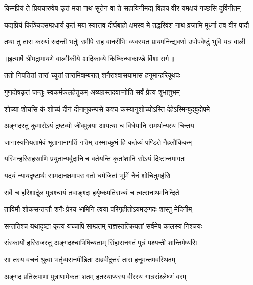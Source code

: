 \fourlineindentedshloka
{किमप्रियं ते प्रियचारुवेष}
{कृतं मया नाथ सुतेन वा ते}
{सहायिनीमद्य विहाय वीर}
{यमक्षयं गच्छसि दुर्विनीतम्} %

\fourlineindentedshloka
{यद्यप्रियं किञ्चिदसम्प्रधार्य}
{कृतं मया स्यात्तव दीर्घबाहो}
{क्षमस्व मे तद्धरिवंश नाथ}
{व्रजामि मूर्ध्ना तव वीर पादौ} %

\fourlineindentedshloka
{तथा तु तारा करुणं रुदन्ती}
{भर्तुः समीपे सह वानरीभिः}
{व्यवस्यत प्रायमनिन्द्यवर्णा}
{उपोपवेष्टुं भुवि यत्र वाली} %


{॥इत्यार्षे श्रीमद्रामायणे वाल्मीकीये आदिकाव्ये किष्किन्धाकाण्डे विंशः सर्गः॥}


\twolineshloka
{ततो निपतितां तारां च्युतां तारामिवाम्बरात्}
{शनैराश्वासयामास हनूमान्हरियूथपः} %

\twolineshloka
{गुणदोषकृतं जन्तुः स्वकर्मफलहेतुकम्}
{अव्यग्रस्तदवाप्नोति सर्वं प्रेत्य शुभाशुभम्} %

\twolineshloka
{शोच्या शोचसि कं शोच्यं दीनं दीनानुकम्पसे}
{कश्च कस्यानुशोच्योऽस्ति देहेऽस्मिन्बुद्बुदोपमे} %

\twolineshloka
{अङ्गदस्तु कुमारोऽयं द्रष्टव्यो जीवपुत्रया}
{आयत्या च विधेयानि समर्थान्यस्य चिन्तय} %

\twolineshloka
{जानास्यनियतामेवं भूतानामागतिं गतिम्}
{तस्माच्छुभं हि कर्तव्यं पण्डिते नैहलौकिकम्} %

\twolineshloka
{यस्मिन्हरिसहस्राणि प्रयुतान्यर्बुदानि च}
{वर्तयन्ति कृतांशानि सोऽयं दिष्टान्तमागतः} %

\twolineshloka
{यदयं न्यायदृष्टार्थः सामदानक्षमापरः}
{गतो धर्मजितां भूमिं नैनं शोचितुमर्हसि} %

\twolineshloka
{सर्वे च हरिशार्दूल पुत्रश्चायं तवाङ्गदः}
{हर्यृष्कपतिराज्यं च त्वत्सनाथमनिन्दिते} %

\twolineshloka
{ताविमौ शोकसन्तप्तौ शनैः प्रेरय भामिनि}
{त्वया परिगृहीतोऽयमङ्गदः शास्तु मेदिनीम्} %

\twolineshloka
{सन्ततिश्च यथादृष्टा कृत्यं यच्चापि साम्प्रतम्}
{राज्ञस्तत्क्रियतां सर्वमेष कालस्य निश्चयः} %

\twolineshloka
{संस्कार्यो हरिराजस्तु अङ्गदश्चाभिषिच्यताम्}
{सिंहासनगतं पुत्रं पश्यन्ती शान्तिमेष्यसि} %

\twolineshloka
{सा तस्य वचनं श्रुत्वा भर्तृव्यसनपीडिता}
{अब्रवीदुत्तरं तारा हनूमन्तमवस्थितम्} %

\twolineshloka
{अङ्गद प्रतिरूपाणां पुत्राणामेकतः शतम्}
{हतस्याप्यस्य वीरस्य गात्रसंश्लेषणं वरम्} %

